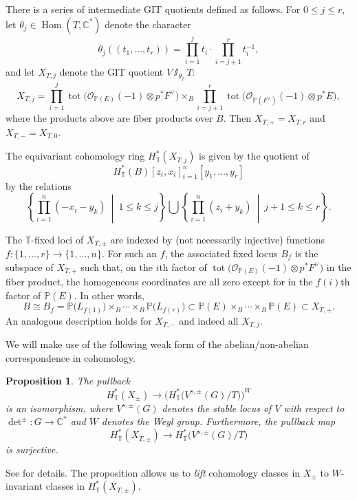\documentclass[11pt]{article}
\numberwithin{equation}{section}
\newtheorem{Proposition}[Theorem]{Proposition}
 { \theoremstyle{definition}
\newtheorem{Definition}[Theorem]{Definition}
\newtheorem{Note}[Theorem]{Note}
\newtheorem{Example}[Theorem]{Example}
\newtheorem{Remark}[Theorem]{Remark} }
\numberwithin{equation}{section}
\newcommand{\cc}[1]{\mathcal{#1}} %
\newcommand{\CC}{\mathbb{C}}
\newcommand{\PP}{\mathbb{P}}
\newcommand{\torus}{\mathbb{T}}
\DeclareMathOperator{\tot}{tot}
\DeclareMathOperator{\Hom}{Hom}
\newcommand{\F}{F}
\newcommand{\E}{E}
\newcommand{\LB}{L}
\newcommand{\z}{z}
\newcommand{\x}{x}
\newcommand{\y}{y}
\begin{document}
There is a series of intermediate GIT quotients defined as follows. For $0\leq j \leq r$, let $\theta_j \in \Hom(T, \CC^*)$ denote the character
\[
\theta_j ((t_1, \dots, t_r)) = \prod_{i=1}^{j} t_i \cdot \prod_{i=j+1}^r t_i^{-1},
\]
and let $X_{T, j}$ denote the GIT quotient $ V \sslash_{\theta_j} T$:
\[
X_{T, j} = \prod_{i=1}^{j} \tot \bigl( \cc O_{\PP(\E)}(-1) \otimes p^*\F^\vee\bigr) \times_B \prod_{i=j+1}^{r} \tot \bigl( \cc O_{\PP(\F^\vee)}(-1) \otimes p^*\E\bigr),
\]
where the products above are fiber products over $B$. Then $X_{T, {+}} = X_{T, r}$ and $X_{T, {-}} = X_{T, 0}$.

The equivariant cohomology ring $H^*_\torus(X_{T, j})$ is given by the quotient of
\[
H^*_\torus(B)[\z_i, \x_i]_{i=1}^n[\y_1, \dots, \y_r]
\]
by the relations
\begin{equation}\label{e:rels}
\left\{\prod_{i=1}^n (- \x_i - \y_k)\ \middle|\ 1 \leq k \leq j\right\} \bigcup \left\{\prod_{i=1}^n (\z_i + \y_k)\ \middle|\ j+1 \leq k \leq r\right\}.
\end{equation}

The $\torus$-fixed loci of $X_{T, \pm}$ are indexed by (not necessarily injective) functions $f\colon \{1, \dots, r\} \to \{1, \dots, n\}$. For such an $f$, the associated fixed locus $B_f$ is the subspace of $X_{T, +}$ such that, on the $i$th factor of
$\tot \bigl( \cc O_{\PP(\E)}(-1) \otimes p^*\F^\vee\bigr)$ in the fiber product, the homogeneous coordinates are all zero except for in the $f(i)$th factor of $\PP(\E)$.
In other words,
\[
B \cong B_f = \PP\bigl(\LB_{f(1)}\bigr) \times_B \cdots \times_B \PP\bigl(\LB_{f(r)}\bigr) \subset \PP(\E) \times_B \cdots \times_B \PP(\E) \subset X_{T, +}.
\]
An analogous description holds for $X_{T, -}$ and indeed all $X_{T, j}$.

We will make use of the following weak form of the abelian/non-abelian correspondence in cohomology.

\begin{Proposition}\label{p:pull}
The pullback
\[
H^*_\torus(X_\pm) \to \bigl(H^*_\torus\bigl( V^{s, \pm}(G)/T\bigr)\bigr)^W
\]
is an isomorphism, where $V^{s, \pm}(G)$ denotes the stable locus of $V$ with respect to $\det^{\pm}\colon G \to \CC^*$ and $W$ denotes the Weyl group. Furthermore, the pullback map
\[
H^*_\torus(X_{T, \pm}) \to H^*_\torus\bigl( V^{s, \pm}(G)/T\bigr)
\]
is surjective.
\end{Proposition}

See \cite[Proposition 1]{Brion} for details.
The proposition allows us to \emph{lift} cohomology classes in $X_{\pm}$ to $W$-invariant classes in $H^*_\torus(X_{T, \pm})$.
\end{document}
